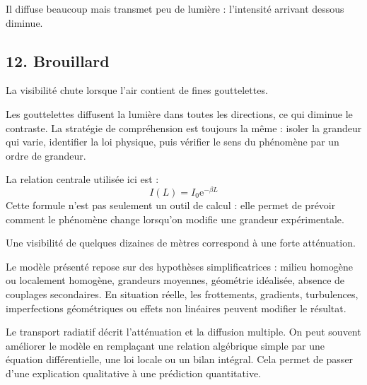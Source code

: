 \documentclass[11pt,a4paper]{article}
\newcommand{\e}{\mathrm e}
\begin{document}
\begin{corrigebox}[Indication]
Il diffuse beaucoup mais transmet peu de lumière : l'intensité arrivant dessous diminue.
\end{corrigebox}


\subsection{12. Brouillard}

\begin{exemplebox}
La visibilité chute lorsque l'air contient de fines gouttelettes.
\end{exemplebox}

\begin{methodebox}
Les gouttelettes diffusent la lumière dans toutes les directions, ce qui diminue le contraste.
La stratégie de compréhension est toujours la même : isoler la grandeur qui varie, identifier la loi physique, puis vérifier le sens du phénomène par un ordre de grandeur.
\end{methodebox}

\begin{theorembox}
La relation centrale utilisée ici est :
\[
I(L)=I_0\e^{-\beta L}
\]
Cette formule n'est pas seulement un outil de calcul : elle permet de prévoir comment le phénomène change lorsqu'on modifie une grandeur expérimentale.
\end{theorembox}

\begin{odgbox}
Une visibilité de quelques dizaines de mètres correspond à une forte atténuation.
\end{odgbox}

\begin{attentionbox}
Le modèle présenté repose sur des hypothèses simplificatrices : milieu homogène ou localement homogène, grandeurs moyennes, géométrie idéalisée, absence de couplages secondaires. En situation réelle, les frottements, gradients, turbulences, imperfections géométriques ou effets non linéaires peuvent modifier le résultat.
\end{attentionbox}

\begin{approfondissementbox}
Le transport radiatif décrit l'atténuation et la diffusion multiple.
On peut souvent améliorer le modèle en remplaçant une relation algébrique simple par une équation différentielle, une loi locale ou un bilan intégral. Cela permet de passer d'une explication qualitative à une prédiction quantitative.
\end{approfondissementbox}
\end{document}
